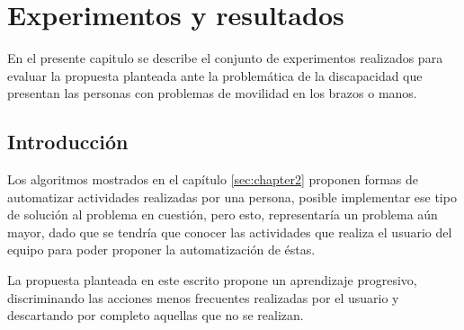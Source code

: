 \chapter{Experimentos y resultados}
\label{sec:chapter5}

En el presente capitulo se describe el conjunto de experimentos realizados
 para evaluar la propuesta planteada ante la problem\'atica de la discapacidad 
 que presentan las personas con problemas de movilidad en los brazos o manos.


\section{Introducci\'on}

Los algoritmos mostrados en el cap\'itulo \ref{sec:chapter2} proponen formas
 de automatizar actividades realizadas por una persona,   posible 
 implementar ese tipo de soluci\'on al problema en cuesti\'on, pero esto, 
 representar\'ia un problema a\'un mayor, dado que se tendr\'ia que conocer 
 las actividades que realiza el usuario del equipo para poder proponer la 
 automatizaci\'on de \'estas. 


La propuesta planteada en este escrito propone un aprendizaje progresivo,
 discriminando las acciones menos frecuentes realizadas por el usuario y 
 descartando por completo aquellas que no se realizan.






